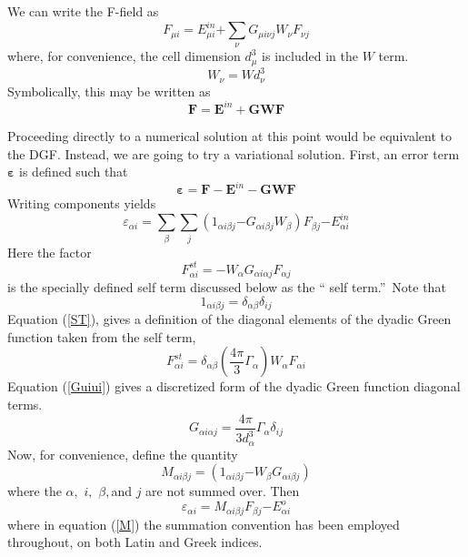 \documentclass{article}
\begin{document}
We can write the F-field as%
\begin{equation}
F_{\mu i}=E_{\mu i}^{in}\mathbf{+}\sum\limits_{\nu }G_{\mu i\nu j}W_{\nu
}F_{\nu j}  \label{AlgF}
\end{equation}%
where, for convenience, the cell dimension $d_{\mu }^{3}$ is included in the 
$W$ term. 
\begin{equation}
W_{\nu }=Wd_{\nu }^{3}
\end{equation}%
Symbolically, this may be written as 
\begin{equation}
\mathbf{F}=\mathbf{E}^{in}+\mathbf{GWF}
\end{equation}

Proceeding directly to a numerical solution at this point would be
equivalent to the DGF. Instead, we are going to try a variational solution.
First, an error term $\mathbf{\varepsilon }$ is defined such that 
\begin{equation}
\mathbf{\varepsilon }=\mathbf{F}-\mathbf{E}^{in}-\mathbf{GWF}
\end{equation}%
Writing components yields 
\begin{equation}
\varepsilon _{\alpha i}\mathbf{=}\sum_{\beta }\sum_{j}\left( 1_{\alpha
i\beta j}\mathbf{-}G_{\alpha i\beta j}W_{\beta }\right) F_{\beta j}\mathbf{-}%
E_{\alpha i}^{in}
\end{equation}%
Here the factor 
\begin{equation}
F_{\alpha i}^{st}=-W_{\alpha }G_{\alpha i\alpha j}F_{\alpha j}  \label{AST}
\end{equation}%
is the specially defined self term discussed below as the \textquotedblleft
self term.\textquotedblright\ Note that 
\begin{equation}
1_{\alpha i\beta j}=\delta _{\alpha \beta }\delta _{ij}
\end{equation}%
Equation (\ref{ST}), gives a definition of the diagonal elements of the
dyadic Green function taken from the self term, 
\begin{equation}
F_{\alpha i}^{st}=\delta _{\alpha \beta }\left( \frac{4\pi }{3}\Gamma
_{\alpha }\right) W_{\alpha }F_{\alpha i}
\end{equation}%
Equation (\ref{Guiui}) gives a discretized form of the dyadic Green function
diagonal terms. 
\begin{equation}
G_{\alpha i\alpha j}=\frac{4\pi }{3d_{\alpha }^{3}}\Gamma _{\alpha }\delta
_{ij}
\end{equation}%
Now, for convenience, define the quantity 
\begin{equation}
M_{\alpha i\beta j}=\left( 1_{\alpha i\beta j}\mathbf{-}W_{\beta }G_{\alpha
i\beta j}\right)
\end{equation}%
where the $\alpha ,$ $i,$ $\beta ,$and $j$ are not summed over. Then 
\begin{equation}
\varepsilon _{\alpha i}\mathbf{=}M_{\alpha i\beta j}F_{\beta j}\mathbf{-}%
E_{\alpha i}^{o}  \label{M}
\end{equation}%
where in equation (\ref{M}) the summation convention has been employed
throughout, on both Latin and Greek indices.
\end{document}
